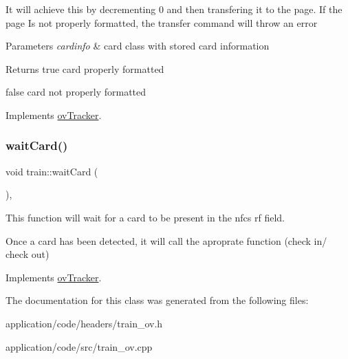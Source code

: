 It will achieve this by decrementing 0 and then transfering it to the page. If the page Is not properly formatted, the transfer command will throw an error 
\begin{DoxyParams}{Parameters}
{\em cardinfo} & card class with stored card information \\
\hline
\end{DoxyParams}
\begin{DoxyReturn}{Returns}
true card properly formatted 

false card not properly formatted 
\end{DoxyReturn}


Implements \hyperlink{classovTracker_a793048db1b73e4e36a0cf11839048f73}{ov\+Tracker}.

\mbox{\label{classtrain_a4509fc35ff69717aab2636dd847981d4}} 
\subsubsection{\texorpdfstring{wait\+Card()}{waitCard()}}
{\footnotesize\ttfamily void train\+::wait\+Card (\begin{DoxyParamCaption}{ }\end{DoxyParamCaption})\hspace{0.3cm}{\ttfamily [override]}, {\ttfamily [virtual]}}



This function will wait for a card to be present in the nfc\textquotesingle{}s rf field. 

Once a card has been detected, it will call the aproprate function (check in/ check out) 

Implements \hyperlink{classovTracker_a43dea6c5e524377f2190e59a7da85b51}{ov\+Tracker}.



The documentation for this class was generated from the following files\+:\begin{DoxyCompactItemize}
\item 
application/code/headers/train\+\_\+ov.\+h\item 
application/code/src/train\+\_\+ov.\+cpp\end{DoxyCompactItemize}
